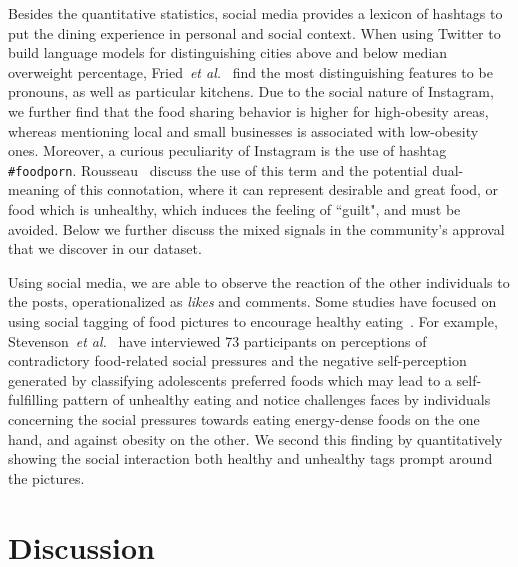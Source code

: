 \documentclass{sig-alternate-2013}
\def\etal{{\it et al.}}
\begin{document}
Besides the quantitative statistics, social media provides a lexicon of hashtags to put the dining experience in personal and social context. When using Twitter to build language models for distinguishing cities above and below median overweight percentage, Fried~\etal~\cite{DBLP:journals/corr/FriedSKHB14} find the most distinguishing features to be pronouns, as well as particular kitchens. Due to the social nature of Instagram, we further find that the food sharing behavior is higher for high-obesity areas, whereas mentioning local and small businesses is associated with low-obesity ones. Moreover, a curious peculiarity of Instagram is the use of hashtag \texttt{\#foodporn}. Rousseau~\cite{foodporn} discuss the use of this term and the potential dual-meaning of this connotation, where it can represent desirable and great food, or food which is unhealthy, which induces the feeling of ``guilt", and must be avoided. Below we further discuss the mixed signals in the community's approval that we discover in our dataset. 




Using social media, we are able to observe the reaction of the other individuals to the posts, operationalized as \textit{likes} and comments. Some studies have focused on using social tagging of food pictures to encourage healthy eating~\cite{Linehan:2010:TST:1753846.1753980, Takeuchi:2014:USM:2638728.2641330}. For example, Stevenson~\etal~\cite{Adolescents} have interviewed 73 participants on perceptions of contradictory food-related social pressures and the negative self-perception generated by classifying adolescents preferred foods which may lead to a self-fulfilling pattern of unhealthy eating and notice challenges faces by individuals concerning the social pressures towards eating energy-dense foods on the one hand, and against obesity on the other. We second this finding by quantitatively showing the social interaction both healthy and unhealthy tags prompt around the pictures.



\section{Discussion}
\label{sec:discussions}
\end{document}
